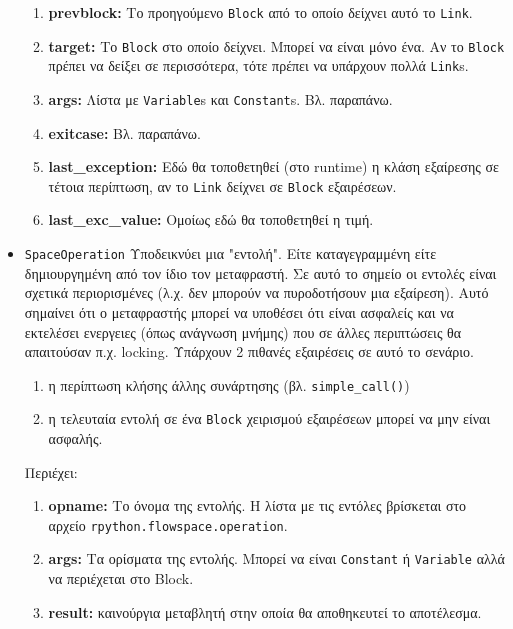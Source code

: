 \begin{itemize}
\begin{enumerate}
\item \textbf{prevblock:} Το προηγούμενο \texttt{Block} από το οποίο δείχνει 
αυτό το \texttt{Link}.
\item \textbf{target:} Το \texttt{Block} στο οποίο δείχνει. Μπορεί να είναι 
μόνο ένα. Αν το \texttt{Block} πρέπει να δείξει σε περισσότερα, τότε πρέπει να 
υπάρχουν πολλά \texttt{Link}s.
\item \textbf{args:} Λίστα με \texttt{Variable}s και \texttt{Constant}s. Βλ. 
παραπάνω.
\item \textbf{exitcase:} Βλ. παραπάνω.
\item \textbf{last\_exception:} Εδώ θα τοποθετηθεί (στο runtime) η κλάση 
εξαίρεσης σε τέτοια περίπτωση, αν το \texttt{Link} δείχνει σε \texttt{Block} 
εξαιρέσεων.
\item \textbf{last\_exc\_value:} Ομοίως εδώ θα τοποθετηθεί η τιμή.
\end{enumerate}

\item \texttt{SpaceOperation} Υποδεικνύει μια "εντολή". Είτε καταγεγραμμένη είτε
δημιουργημένη από τον ίδιο τον μεταφραστή. Σε αυτό το σημείο οι εντολές είναι
σχετικά περιορισμένες (λ.χ. δεν μπορούν να πυροδοτήσουν μια εξαίρεση). Αυτό
σημαίνει ότι ο μεταφραστής μπορεί να υποθέσει ότι είναι ασφαλείς και να
εκτελέσει ενεργειες (όπως ανάγνωση μνήμης) που σε άλλες περιπτώσεις θα
απαιτούσαν π.χ. locking. Υπάρχουν 2 πιθανές εξαιρέσεις σε αυτό το σενάριο.

\begin{enumerate}
\item η περίπτωση κλήσης άλλης συνάρτησης (βλ. \texttt{simple\_call()})
\item η τελευταία εντολή σε ένα \texttt{Block} χειρισμού εξαιρέσεων μπορεί να
μην είναι ασφαλής.
\end{enumerate}

Περιέχει:

\begin{enumerate}

\item \textbf{opname:} Το όνομα της εντολής. Η λίστα με τις εντόλες βρίσκεται 
στο αρχείο \texttt{rpython.flowspace.operation}.
\item \textbf{args:} Τα ορίσματα της εντολής. Μπορεί να είναι \texttt{Constant}
ή \texttt{Variable} αλλά να περιέχεται στο Block.
\item \textbf{result:} καινούργια μεταβλητή στην οποία θα αποθηκευτεί το 
αποτέλεσμα.
\end{enumerate}


\end{itemize}
